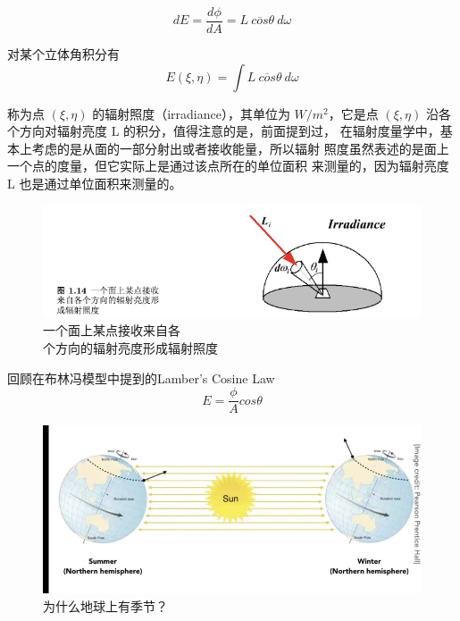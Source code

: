 \begin{equation}
    dE=\frac{d\phi}{dA}=L\ \overline{cos}\theta\ d\omega
\end{equation}

对某个立体角积分有
\begin{equation}
    E(\xi,\eta)=\int L\ \overline{cos}\theta\ d\omega
\end{equation}

称为点 $(\xi ,\eta)$ 的辐射照度（irradiance），其单位为 $W /m^2$，它是点 $(\xi, \eta)$
沿各个方向对辐射亮度 L 的积分，值得注意的是，前面提到过，
在辐射度量学中，基本上考虑的是从面的一部分射出或者接收能量，所以辐射
照度虽然表述的是面上一个点的度量，但它实际上是通过该点所在的单位面积
来测量的，因为辐射亮度 L 也是通过单位面积来测量的。

\begin{figure}[H]
    \centering
    \includegraphics[scale=0.4]{figures/辐射照度模型.png}
    \caption{一个面上某点接收来自各\\个方向的辐射亮度形成辐射照度}
\end{figure}

回顾在布林冯模型中提到的Lamber's Cosine Law
\begin{equation}
    E=\frac{\phi}{A}cos\theta
\end{equation}

\begin{figure}[H]
    \centering
    \includegraphics[scale=0.4]{figures/为什么有季节.png}
    \caption{为什么地球上有季节？}
\end{figure}

